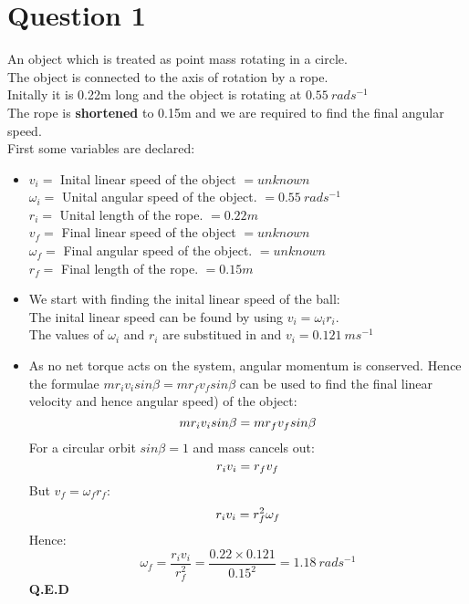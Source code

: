 \documentclass[12pt]{article}
\begin{document}
\section{Question 1}
An object which is treated as point mass rotating in a circle. \\
The object is connected to the axis of rotation by a rope. \\
Initally it is 0.22m long and the object is rotating at $0.55 \ rads^{-1}$ \\
The rope is \textbf{shortened} to 0.15m and we are required to find the final angular speed.\\

First some variables are declared: \\ 
\begin{itemize}
\item $v_i =$ Inital linear speed of the object $=unknown$ \\
$\omega_i =$  Unital angular speed of the object. $= 0.55 \ rads^{-1} $ \\
$r_i =$ Unital length of the rope. $= 0.22m $ \\
$v_f =$ Final linear speed of the object $= unknown$ \\
$\omega_f =$  Final angular speed of the object. $ = unknown$\\
$r_f =$ Final length of the rope. $ = 0.15m$

\item We start with finding the inital linear speed of the ball: \\
The inital linear speed can be found by using $v_i=\omega_ir_i$. \\
The values of $\omega_i$ and $r_i$ are substitued in and $v_i = 0.121 \ ms^{-1}$
\item As no net torque acts on the system, angular momentum is conserved. Hence the formulae $mr_iv_isin\beta=mr_fv_fsin\beta$ can be used to find the final linear velocity and hence angular speed) of the object: \\
\begin{displaymath}
mr_iv_isin\beta=mr_fv_fsin\beta \\
\end{displaymath}
For a circular orbit $sin\beta=1$ and mass cancels out: \\
\begin{displaymath}
r_iv_i=r_fv_f \\
\end{displaymath}
But $v_f=\omega_fr_f$: \\
\begin{displaymath}
r_iv_i=r_f^2\omega_f \\
\end{displaymath}
Hence:
\begin{displaymath}
\omega_f = \frac{r_iv_i}{r_f^2}=\frac{0.22\times0.121}{0.15^2}=1.18 \ rads^{-1}
\end{displaymath}
\textbf{Q.E.D}


\end{itemize}
\end{document}
